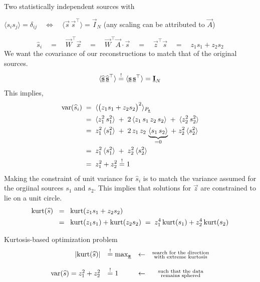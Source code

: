 \begin{frame}

Two statistically independent sources with

$\langle s_i s_j \rangle = \delta_{ij} \quad \Leftrightarrow \quad \langle \vec s \, \vec s^\top \rangle = \vec I_N$ (any scaling can be attributed to $\vec A$)

\begin{equation*}
\widehat{s}_i \quad 
= \quad \vec{W}^\top \vec{x} \quad 
= \quad  \vec{W}^\top \vec{A} \cdot \vec{s} \quad 
=  \quad \vec{z}^\top \vec{s} \quad 
= \quad z_1 s_1 + z_2 s_2
\end{equation*}
\vspace{1mm}
We want the covariance of our reconstructions to match that of the original sources.
\begin{equation*}
\langle \widehat{\underline{\mathbf{s}}} \, \widehat{\underline{\mathbf{s}}}^\top \rangle \stackrel{\mathrm{!}}{=} \langle \underline{\mathbf{s}} \, \underline{\mathbf{s}}^\top \rangle = \underline{\mathbf{I}}_N
\end{equation*}
This implies,
\begin{align*}
\operatorname{var}(\widehat{s}_i)
 \; &= \; \langle \big( z_1 s_1 + z_2 s_2 \big)^2 \rangle_{P_{\underline{\mathbf{s}}}}\\
 \; &= \; \langle z_1^2 \, s_1^2 \rangle \;+\; 2 \, \langle z_1\, s_1\, z_2 \, s_2 \rangle \;+\; \langle z_2^2 \, s_2^2 \rangle \\
 \; &= \; z_1^2 \, \langle s_1^2 \rangle \;+\; 2 \, z_1\, z_2 \, \underbrace{\langle  s_1\,  s_2 \rangle}_{= 0} \;+\; z_2^2 \, \langle  s_2^2 \rangle \\
 \; &= \; z_1^2 \, \langle s_1^2 \rangle \;+\; z_2^2 \,\langle s_2^2 \rangle \\
 \; &= \; z_1^2 + z_2^2 \stackrel{\mathrm{!}}{=} 1
\end{align*}
Making the constraint of unit variance for $\widehat{s}_i$ is to match the variance assumed for the orgiinal sources $s_1$ and $s_2$. This implies that solutions for $\vec z$ are constrained to lie on a unit circle.
\vspace{1mm}
\begin{align*}
\operatorname{kurt}(\widehat{s})  \;\; &= \;\; \operatorname{kurt}(z_1 s_1 + z_2 s_2) \;\; \\ &= \;\; \operatorname{kurt}(z_1 s_1) + \operatorname{kurt}(z_2 s_2) \; = \; z_1^4 \operatorname{kurt}(s_1) + z_2^4 \operatorname{kurt}(s_2)
\end{align*}

\begin{block}{Kurtosis-based optimization problem}
\begin{equation*}
	\begin{array}{rllc}
	\left| \operatorname{kurt}(\widehat{s}) \right| & \stackrel{\mathrm{!}}{=} \max_{\underline{\mathbf{z}}} 
	& \leftarrow & \substack{ 	\text{search for the direction} \\
					\text{with extreme kurtosis}} \\\\
	\operatorname{var}(\widehat{s}) = z_1^2 + z_2^2 & \stackrel{\mathrm{!}}{=} 1
	& \leftarrow & \substack{	\text{such that the data} \\
					\text{remains sphered}}
	\end{array} 
\end{equation*}
  \end{block}
\end{frame}

